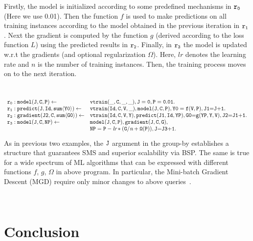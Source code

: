 \documentclass[11pt]{article}
\def\mt{\tt}
\newcommand{\cldl}{\[\begin{array}{ll}}
\newcommand{\eldl}{\end{array}\]\rm}
\newcommand{\prule}[2]{ \mt #1 \leftarrow & \mt #2 \\}
\def\pbody#1#2{ \mt #1 & \mt #2 \\}
\def\sinv{\vspace{-0.1cm}}
\def\sinv{\vspace{-0.1cm}}
\def\rof#1{$\tt r_{#1}$}
\begin{document}
Firstly, the model is initialized according to some predefined mechanisms in \rof{0} (Here we use  0.01). 
Then the function $f$ is used to make predictions on all training instances according to the model obtained in 
the previous iteration in  \rof{1}.
Next the gradient is computed by the function $g$ (derived according to the loss function $L$) using the predicted results in \rof{2}.
Finally, in \rof{3} the model is updated w.r.t the gradients (and optional regularization $\Omega$).
Here, $lr$ denotes the learning rate and $n$ is the number of training instances.
Then, the training process moves on to the next iteration.
\begin{example} 
\label{ex:bgd}
~\\[-0.2cm]
\cldl
\prule{r_{0}:model(J, C, P)}{ vtrain(\_, C, \_, \_), J=0, P=0.01.}
\prule{r_{1}:predict(J,Id, sum \langle Y0 \rangle) }{vtrain(Id, C, V, \_), model(J, C, P),Y0 = f(V, P), J1 {=} J {+}1.}
\prule{r_{2}: gradient(J2,C,sum \langle G0 \rangle) }{vtrain(Id, C, V, Y), predict(J1, Id, YP),G0 {=} g(YP, Y, V), J2 {=} J1 {+}1.}
\prule{r_{3}:model(J, C, NP) }{ model(J, C, P), gradient(J, C, G), }
\pbody{}{NP = P - \emph{lr} * (G / \emph{n} + \Omega(P)), J {=} J3 {+}1.\sinv}
\eldl
\end{example}
As in previous two examples, the $\tt J$ argument in the group-by establishes a structure that guarantees SMS 
and superior scalability via BSP. The same is true for a wide spectrum of ML algorithms 
that can be expressed with different functions $f$, $g$, $\Omega$ in above program.
In particular, the Mini-batch Gradient Descent (MGD)  require only minor changes to above queries~\cite{datalogml}.

~\\[-0.4cm]

\section{Conclusion}
\end{document}
